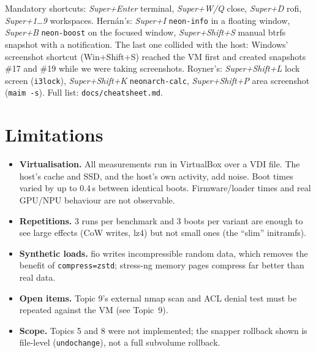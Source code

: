 \documentclass[10.5pt,a4paper]{article}
\newcommand{\cmd}[1]{\texttt{#1}}
\begin{document}
Mandatory shortcuts: \emph{Super+Enter} terminal, \emph{Super+W/Q} close, \emph{Super+D} rofi, \emph{Super+1…9} workspaces. Hernán's: \emph{Super+I} \cmd{neon-info} in a floating window, \emph{Super+B} \cmd{neon-boost} on the focused window, \emph{Super+Shift+S} manual btrfs snapshot with a notification. The last one collided with the host: Windows' screenshot shortcut (Win+Shift+S) reached the VM first and created snapshots \#17 and \#19 while we were taking screenshots. Royner's: \emph{Super+Shift+L} lock screen (\cmd{i3lock}), \emph{Super+Shift+K} \cmd{neonarch-calc}, \emph{Super+Shift+P} area screenshot (\cmd{maim -s}). Full list: \cmd{docs/cheatsheet.md}.

\section{Limitations}
\begin{itemize}
\item \textbf{Virtualisation.} All measurements run in VirtualBox over a VDI file. The host's cache and SSD, and the host's own activity, add noise. Boot times varied by up to 0.4\,s between identical boots. Firmware/loader times and real GPU/NPU behaviour are not observable.
\item \textbf{Repetitions.} 3 runs per benchmark and 3 boots per variant are enough to see large effects (CoW writes, lz4) but not small ones (the ``slim'' initramfs).
\item \textbf{Synthetic loads.} fio writes incompressible random data, which removes the benefit of \cmd{compress=zstd}; stress-ng memory pages compress far better than real data.
\item \textbf{Open items.} Topic 9's external nmap scan and ACL denial test must be repeated against the VM (see Topic~9).
\item \textbf{Scope.} Topics 5 and 8 were not implemented; the snapper rollback shown is file-level (\cmd{undochange}), not a full subvolume rollback.
\end{itemize}

\end{document}

